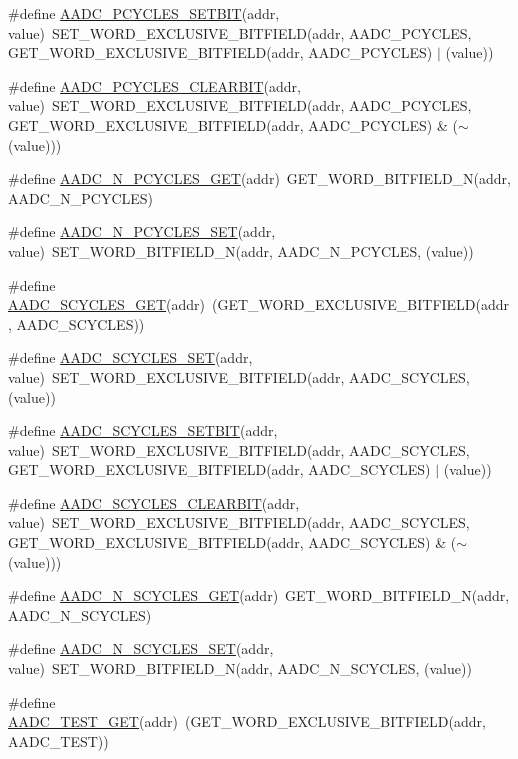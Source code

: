 \begin{DoxyCompactItemize}
\item 
\#define \hyperlink{a00542_aad58b4eff3c03339a04675376d4be772}{AADC\_\-PCYCLES\_\-SETBIT}(addr, value)~SET\_\-WORD\_\-EXCLUSIVE\_\-BITFIELD(addr, AADC\_\-PCYCLES, GET\_\-WORD\_\-EXCLUSIVE\_\-BITFIELD(addr, AADC\_\-PCYCLES) $|$ (value))
\item 
\#define \hyperlink{a00542_abe928af25dceea07c2b1110b41ff04db}{AADC\_\-PCYCLES\_\-CLEARBIT}(addr, value)~SET\_\-WORD\_\-EXCLUSIVE\_\-BITFIELD(addr, AADC\_\-PCYCLES, GET\_\-WORD\_\-EXCLUSIVE\_\-BITFIELD(addr, AADC\_\-PCYCLES) \& ($\sim$(value)))
\item 
\#define \hyperlink{a00542_a4e0bde0f6d833395d7b097838eda0f03}{AADC\_\-N\_\-PCYCLES\_\-GET}(addr)~GET\_\-WORD\_\-BITFIELD\_\-N(addr, AADC\_\-N\_\-PCYCLES)
\item 
\#define \hyperlink{a00542_af51864e0fe2ef9378d322ad7e7084610}{AADC\_\-N\_\-PCYCLES\_\-SET}(addr, value)~SET\_\-WORD\_\-BITFIELD\_\-N(addr, AADC\_\-N\_\-PCYCLES, (value))
\item 
\#define \hyperlink{a00542_a60b06ac9ba93e3c47361a54c5bce5d8d}{AADC\_\-SCYCLES\_\-GET}(addr)~(GET\_\-WORD\_\-EXCLUSIVE\_\-BITFIELD(addr, AADC\_\-SCYCLES))
\item 
\#define \hyperlink{a00542_a3363e670b5d31fba58827bc100c46de6}{AADC\_\-SCYCLES\_\-SET}(addr, value)~SET\_\-WORD\_\-EXCLUSIVE\_\-BITFIELD(addr, AADC\_\-SCYCLES, (value))
\item 
\#define \hyperlink{a00542_a5ea1b4a4e87e02e73e94d42762344b53}{AADC\_\-SCYCLES\_\-SETBIT}(addr, value)~SET\_\-WORD\_\-EXCLUSIVE\_\-BITFIELD(addr, AADC\_\-SCYCLES, GET\_\-WORD\_\-EXCLUSIVE\_\-BITFIELD(addr, AADC\_\-SCYCLES) $|$ (value))
\item 
\#define \hyperlink{a00542_aad7cd3958a3bd5c15682c21fa4157f78}{AADC\_\-SCYCLES\_\-CLEARBIT}(addr, value)~SET\_\-WORD\_\-EXCLUSIVE\_\-BITFIELD(addr, AADC\_\-SCYCLES, GET\_\-WORD\_\-EXCLUSIVE\_\-BITFIELD(addr, AADC\_\-SCYCLES) \& ($\sim$(value)))
\item 
\#define \hyperlink{a00542_a0c9b93207bcb80f865b828e310270cc7}{AADC\_\-N\_\-SCYCLES\_\-GET}(addr)~GET\_\-WORD\_\-BITFIELD\_\-N(addr, AADC\_\-N\_\-SCYCLES)
\item 
\#define \hyperlink{a00542_a268b90dea52953871a4b9ee3e49a38b8}{AADC\_\-N\_\-SCYCLES\_\-SET}(addr, value)~SET\_\-WORD\_\-BITFIELD\_\-N(addr, AADC\_\-N\_\-SCYCLES, (value))
\item 
\#define \hyperlink{a00542_a1bde9fc9948996b5c894bb793244de70}{AADC\_\-TEST\_\-GET}(addr)~(GET\_\-WORD\_\-EXCLUSIVE\_\-BITFIELD(addr, AADC\_\-TEST))
\item 

\end{DoxyCompactItemize}

